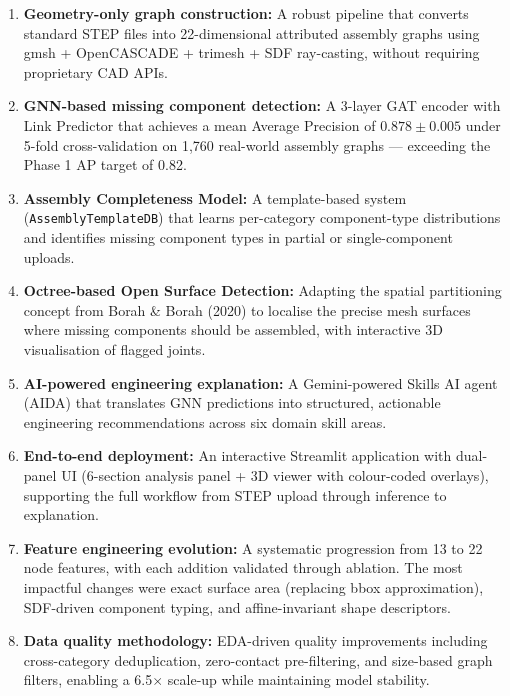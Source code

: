 \documentclass[12pt]{report}
\begin{document}
\begin{enumerate}
    \item \textbf{Geometry-only graph construction:} A robust pipeline that converts standard STEP files into 22-dimensional attributed assembly graphs using gmsh + OpenCASCADE + trimesh + SDF ray-casting, without requiring proprietary CAD APIs.

    \item \textbf{GNN-based missing component detection:} A 3-layer GAT encoder with Link Predictor that achieves a mean Average Precision of $0.878 \pm 0.005$ under 5-fold cross-validation on 1,760 real-world assembly graphs --- exceeding the Phase 1 AP target of 0.82.

    \item \textbf{Assembly Completeness Model:} A template-based system (\texttt{AssemblyTemplateDB}) that learns per-category component-type distributions and identifies missing component types in partial or single-component uploads.

    \item \textbf{Octree-based Open Surface Detection:} Adapting the spatial partitioning concept from Borah \& Borah (2020) to localise the precise mesh surfaces where missing components should be assembled, with interactive 3D visualisation of flagged joints.

    \item \textbf{AI-powered engineering explanation:} A Gemini-powered Skills AI agent (AIDA) that translates GNN predictions into structured, actionable engineering recommendations across six domain skill areas.

    \item \textbf{End-to-end deployment:} An interactive Streamlit application with dual-panel UI (6-section analysis panel + 3D viewer with colour-coded overlays), supporting the full workflow from STEP upload through inference to explanation.

    \item \textbf{Feature engineering evolution:} A systematic progression from 13 to 22 node features, with each addition validated through ablation. The most impactful changes were exact surface area (replacing bbox approximation), SDF-driven component typing, and affine-invariant shape descriptors.

    \item \textbf{Data quality methodology:} EDA-driven quality improvements including cross-category deduplication, zero-contact pre-filtering, and size-based graph filters, enabling a 6.5$\times$ scale-up while maintaining model stability.
\end{enumerate}
\end{document}
